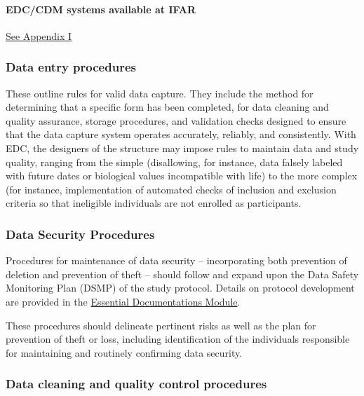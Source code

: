 \documentclass[]{book}
\theoremstyle{definition}
\theoremstyle{definition}
\theoremstyle{definition}
\theoremstyle{remark}
\begin{document}
\paragraph{EDC/CDM systems available at
IFAR}\label{edccdm-systems-available-at-ifar}

\href{https://ifar-isac.github.io/book/data-management.html\#appendix-i}{See
Appendix I}

\subsubsection{Data entry procedures}\label{data-entry-procedures}

These outline rules for valid data capture. They include the method for
determining that a specific form has been completed, for data cleaning
and quality assurance, storage procedures, and validation checks
designed to ensure that the data capture system operates accurately,
reliably, and consistently. With EDC, the designers of the structure may
impose rules to maintain data and study quality, ranging from the simple
(disallowing, for instance, data falsely labeled with future dates or
biological values incompatible with life) to the more complex (for
instance, implementation of automated checks of inclusion and exclusion
criteria so that ineligible individuals are not enrolled as
participants.

\subsubsection{Data Security Procedures}\label{data-security-procedures}

Procedures for maintenance of data security -- incorporating both
prevention of deletion and prevention of theft -- should follow and
expand upon the Data Safety Monitoring Plan (DSMP) of the study
protocol. Details on protocol development are provided in the
\href{https://ifar-isac.github.io/book/essential-documentations.html}{Essential
Documentations Module}.

These procedures should delineate pertinent risks as well as the plan
for prevention of theft or loss, including identification of the
individuals responsible for maintaining and routinely confirming data
security.

\subsubsection{Data cleaning and quality control
procedures}\label{data-cleaning-and-quality-control-procedures}
\end{document}
